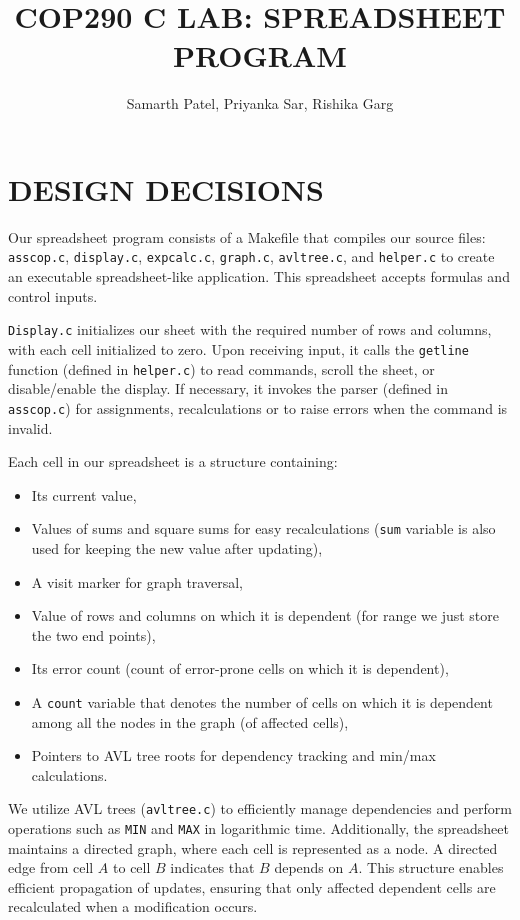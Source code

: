 \documentclass[a4paper]{article}
\title{COP290 C LAB: SPREADSHEET PROGRAM}
\author{Samarth Patel, Priyanka Sar, Rishika Garg}
\begin{document}
\maketitle

\section{DESIGN DECISIONS}

Our spreadsheet program consists of a Makefile that compiles our source files: \texttt{asscop.c}, \texttt{display.c}, \texttt{expcalc.c}, \texttt{graph.c}, \texttt{avltree.c}, and \texttt{helper.c} to create an executable spreadsheet-like application. This spreadsheet accepts formulas and control inputs.

\texttt{Display.c} initializes our sheet with the required number of rows and columns, with each cell initialized to zero. Upon receiving input, it calls the \texttt{getline} function (defined in \texttt{helper.c}) to read commands, scroll the sheet, or disable/enable the display. If necessary, it invokes the parser (defined in \texttt{asscop.c}) for assignments, recalculations or to raise errors when the command is invalid. 

Each cell in our spreadsheet is a structure containing:
\begin{itemize}
    \item Its current value,
    \item Values of sums and square sums for easy recalculations (\texttt{sum} variable is also used for keeping the new value after updating),
    \item A visit marker for graph traversal,
    \item Value of rows and columns on which it is dependent (for range we just store the two end points),
    \item Its error count (count of error-prone cells on which it is dependent),
    \item A \texttt{count} variable that denotes the number of cells on which it is dependent among all the nodes in the graph (of affected cells),
    \item Pointers to AVL tree roots for dependency tracking and min/max calculations.
\end{itemize}

We utilize AVL trees (\texttt{avltree.c}) to efficiently manage dependencies and perform operations such as \texttt{MIN} and \texttt{MAX} in logarithmic time. Additionally, the spreadsheet maintains a directed graph, where each cell is represented as a node. A directed edge from cell $A$ to cell $B$ indicates that $B$ depends on $A$. This structure enables efficient propagation of updates, ensuring that only affected dependent cells are recalculated when a modification occurs.
\end{document}
